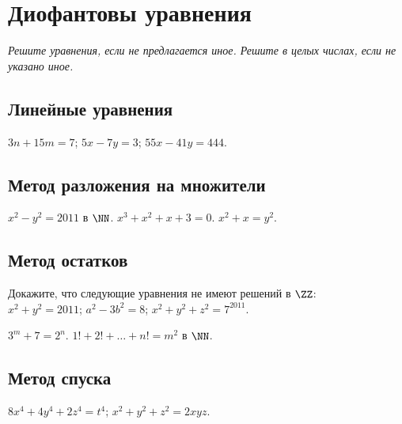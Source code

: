 

\section*{Диофантовы уравнения}


\emph{%
Решите уравнения, если не предлагается иное.
Решите в целых числах, если не указано иное.}

\subsection*{Линейные уравнения}

\begin{problems}

\item
$3n + 15 m = 7$;
\qquad
$5 x - 7 y = 3$;
\qquad
$55 x - 41 y = 444$.

\end{problems}

\subsection*{Метод разложения на множители}

\begin{problems}

\item
$x^2 - y^2 = 2011$\; в $\NN$.
\qquad
\problem
$x^3 + x^2 + x + 3 = 0$.
\qquad
\problem
$x^2 + x = y^2$.

\end{problems}

\subsection*{Метод остатков}

\begin{problems}

\item
Докажите, что следующие уравнения не имеют решений в $\ZZ$:
\\
\sbp $x^2 + y^2 = 2011$;
\qquad
\sbp $a^2 - 3 b^2 = 8$;
\qquad
\sbp $x^2 + y^2 + z^2 = 7^{2011}$.

\item
$3^m + 7 = 2^n$.
\qquad
\problem
$1! + 2! + \ldots + n! = m^2$\; в $\NN$.

\end{problems}

\subsection*{Метод спуска}

\begin{problems}

\item
$8 x^4 + 4 y^4 + 2 z^4 = t^4$;
\qquad
\problem
$x^2 + y^2 + z^2 = 2 x y z$.

\end{problems}


